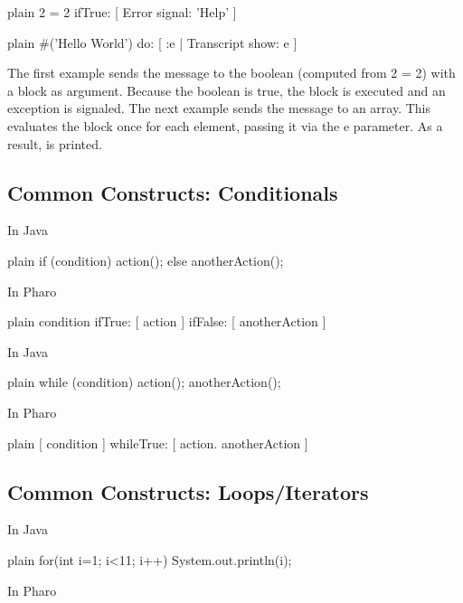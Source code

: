 \documentclass[10pt,twoside,english]{_support/latex/sbabook/sbabook}
\begin{document}
\begin{displaycode}{plain}
2 = 2
  ifTrue: [ Error signal: 'Help' ]
\end{displaycode}

\begin{displaycode}{plain}
#('Hello World')
  do: [ :e | Transcript show: e ]
\end{displaycode}

The first example sends the message  to the boolean  (computed from
2 = 2) with a block as argument. Because the boolean is true,
the block is executed and an exception is signaled. The next example
sends the message  to an array. This evaluates the block
once for each element, passing it via the e parameter. As a
result,  is printed.
\subsection{Common Constructs: Conditionals}
In Java

\begin{displaycode}{plain}
if (condition)
	{ action(); }
	else { anotherAction();} 
\end{displaycode}

In Pharo

\begin{displaycode}{plain}
condition
	ifTrue: [ action ]
	ifFalse: [ anotherAction ]
\end{displaycode}

In Java

\begin{displaycode}{plain}
while (condition) { action(); 
     anotherAction(); }
\end{displaycode}

In Pharo

\begin{displaycode}{plain}
[ condition ] whileTrue: [ action. anotherAction ]
\end{displaycode}
\subsection{Common Constructs: Loops/Iterators}
In Java

\begin{displaycode}{plain}
for(int i=1; i<11; i++){
    System.out.println(i); } 
\end{displaycode}

In Pharo
\end{document}
